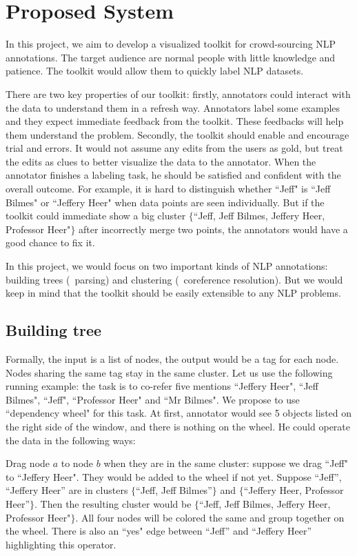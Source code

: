 \section{Proposed System}

In this project, we aim to develop a visualized toolkit for
crowd-sourcing NLP annotations. The target audience are normal people
with little knowledge and patience. The toolkit would allow them to
quickly label NLP datasets.

There are two key properties of our toolkit: firstly, annotators could
interact with the data to understand them in a refresh way. Annotators
label some examples and they expect immediate feedback from the
toolkit. These feedbacks will help them understand the problem.
Secondly, the toolkit should enable and encourage trial and errors. It
would not assume any edits from the users as gold, but treat the edits
as clues to better visualize the data to the annotator. When the
annotator finishes a labeling task, he should be satisfied and
confident with the overall outcome. For example, it is hard to
distinguish whether ``Jeff" is ``Jeff Bilmes" or ``Jeffery Heer" when
data points are seen individually. But if the toolkit could immediate
show a big cluster $\{$``Jeff, Jeff Bilmes, Jeffery Heer, Professor
Heer"$\}$ after incorrectly merge two points, the annotators would
have a good chance to fix it.

In this project, we would focus on two important kinds of NLP
annotations: building trees (\eg\  parsing) and clustering (\eg\
coreference resolution). But we would keep in mind that the toolkit
should be easily extensible to any NLP problems. 

\subsection{Building tree}

Formally, the input is a list of nodes, the output would be a tag for
each node. Nodes sharing the same tag stay in the same cluster. Let us
use the following running example: the task is to co-refer five
mentions ``Jeffery Heer", ``Jeff Bilmes", ``Jeff", ``Professor Heer"
and ``Mr Bilmes". We propose to use ``dependency wheel" for this task.
At first, annotator would see 5 objects listed on the right side of
the window, and there is nothing on the wheel. He could operate the
data in the following ways:

Drag node $a$ to node $b$ when they are in the same cluster: suppose
we drag ``Jeff" to ``Jeffery Heer". They would be added to the wheel
if not yet. Suppose ``Jeff'', ``Jeffery Heer'' are in clusters
  $\{$``Jeff, Jeff Bilmes''$\}$ and $\{$``Jeffery Heer, Professor
  Heer''$\}$. Then the resulting cluster would be $\{$``Jeff, Jeff
  Bilmes, Jeffery Heer, Professor Heer"$\}$. All four nodes will be
  colored the same and group together on the wheel. There is also an
  ``yes" edge between ``Jeff'' and ``Jeffery Heer'' highlighting this
  operator. 

